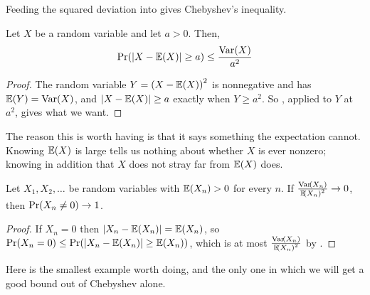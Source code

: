 Feeding the squared deviation into  gives Chebyshev's inequality.

\begin{boxtheorem} \label{Ch1:Thm:Chebyshev}
    Let $X$ be a random variable and let $a > 0$. Then,
    \begin{align*}
        \Pr\!\left( \left\lvert X - \mathbb{E}(X) \right\rvert \geq a \right) \leq \frac{\operatorname{Var}\!\left( X \right)}{a^2}
    \end{align*}
\end{boxtheorem}
\begin{proof}
    The random variable $Y = \left( X - \mathbb{E}(X) \right)^2$ is nonnegative and has $\mathbb{E}(Y) = \operatorname{Var}\!\left( X \right)$, and $\left\lvert X - \mathbb{E}(X) \right\rvert \geq a$ exactly when $Y \geq a^2$. So , applied to $Y$ at $a^2$, gives what we want.
\end{proof}

The reason this is worth having is that it says something the expectation cannot. Knowing $\mathbb{E}(X)$ is large tells us nothing about whether $X$ is ever nonzero; knowing in addition that $X$ does not stray far from $\mathbb{E}(X)$ does.

\begin{boxcorollary} \label{Ch1:Cor:Second_Moment}
    Let $X_1, X_2, \ldots$ be random variables with $\mathbb{E}\!\left( X_n \right) > 0$ for every $n$. If $\frac{\operatorname{Var}\!\left( X_n \right)}{\mathbb{E}\!\left( X_n \right)^2} \to 0$, then $\Pr\!\left( X_n \neq 0 \right) \to 1$.
\end{boxcorollary}
\begin{proof}
    If $X_n = 0$ then $\left\lvert X_n - \mathbb{E}\!\left( X_n \right) \right\rvert = \mathbb{E}\!\left( X_n \right)$, so $\Pr\!\left( X_n = 0 \right) \leq \Pr\!\left( \left\lvert X_n - \mathbb{E}\!\left( X_n \right) \right\rvert \geq \mathbb{E}\!\left( X_n \right) \right)$, which is at most $\frac{\operatorname{Var}\!\left( X_n \right)}{\mathbb{E}\!\left( X_n \right)^2}$ by .
\end{proof}

Here is the smallest example worth doing, and the only one in which we will get a good bound out of Chebyshev alone.

